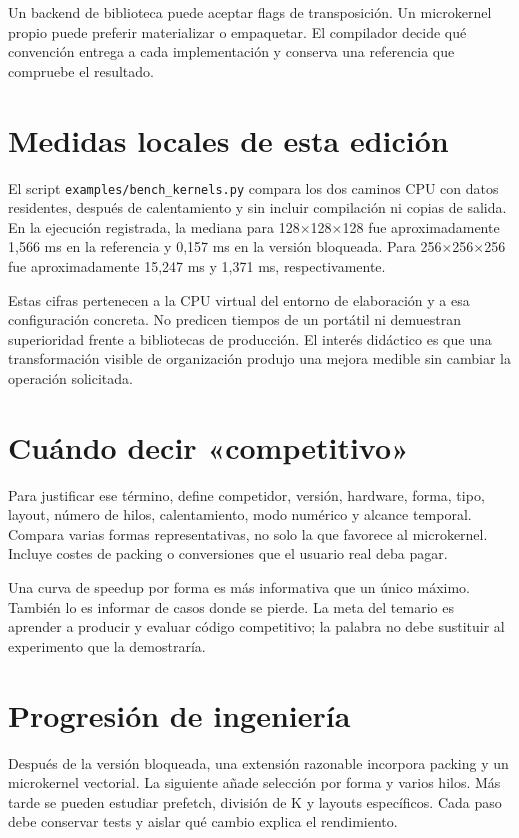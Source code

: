 \documentclass[12pt,a4paper,oneside]{report}
\begin{document}
Un backend de biblioteca puede aceptar flags de transposición. Un microkernel propio puede preferir materializar o empaquetar. El compilador decide qué convención entrega a cada implementación y conserva una referencia que compruebe el resultado.

\section{Medidas locales de esta edición}
El script \texttt{examples/ben\allowbreak{}ch\_kernels.p\allowbreak{}y} compara los dos caminos CPU con datos residentes, después de calentamiento y sin incluir compilación ni copias de salida. En la ejecución registrada, la mediana para 128\ensuremath{\times}128\ensuremath{\times}128 fue aproximadamente 1,566 ms en la referencia y 0,157 ms en la versión bloqueada. Para 256\ensuremath{\times}256\ensuremath{\times}256 fue aproximadamente 15,247 ms y 1,371 ms, respectivamente.

Estas cifras pertenecen a la CPU virtual del entorno de elaboración y a esa configuración concreta. No predicen tiempos de un portátil ni demuestran superioridad frente a bibliotecas de producción. El interés didáctico es que una transformación visible de organización produjo una mejora medible sin cambiar la operación solicitada.

\section{Cuándo decir «competitivo»}
Para justificar ese término, define competidor, versión, hardware, forma, tipo, layout, número de hilos, calentamiento, modo numérico y alcance temporal. Compara varias formas representativas, no solo la que favorece al microkernel. Incluye costes de packing o conversiones que el usuario real deba pagar.

Una curva de speedup por forma es más informativa que un único máximo. También lo es informar de casos donde se pierde. La meta del temario es aprender a producir y evaluar código competitivo; la palabra no debe sustituir al experimento que la demostraría.

\section{Progresión de ingeniería}
Después de la versión bloqueada, una extensión razonable incorpora packing y un microkernel vectorial. La siguiente añade selección por forma y varios hilos. Más tarde se pueden estudiar prefetch, división de K y layouts específicos. Cada paso debe conservar tests y aislar qué cambio explica el rendimiento.
\end{document}
